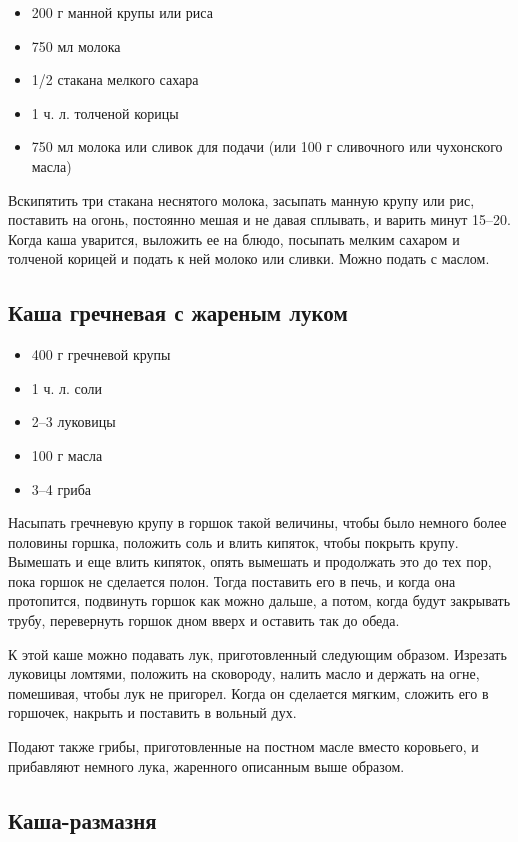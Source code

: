 \begin{itemize}
	\item 200 г манной крупы или риса
    \item 750 мл молока
    \item 1/2 стакана мелкого сахара
    \item 1 ч. л. толченой корицы 
    \item 750 мл молока или сливок для подачи (или 100 г сливочного или чухонского масла)
\end{itemize}

Вскипятить три стакана неснятого молока, засыпать манную крупу или рис, поставить на огонь, постоянно мешая и не давая сплывать, и варить минут 15–20. Когда каша уварится, выложить ее на блюдо, посыпать мелким сахаром и толченой корицей и подать к ней молоко или сливки. Можно подать с маслом.

\subsection{Каша гречневая с жареным луком}

\begin{itemize}
	\item 400 г гречневой крупы 
    \item 1 ч. л. соли
    \item 2–3 луковицы 
    \item 100 г масла
    \item 3–4 гриба
\end{itemize}

Насыпать гречневую крупу в горшок такой величины, чтобы было немного более половины горшка, положить соль и влить кипяток, чтобы покрыть крупу. Вымешать и еще влить кипяток, опять вымешать и продолжать это до тех пор, пока горшок не сделается полон. Тогда поставить его в печь, и когда она протопится, подвинуть горшок как можно дальше, а потом, когда будут закрывать трубу, перевернуть горшок дном вверх и оставить так до обеда.

К этой каше можно подавать лук, приготовленный следующим образом. Изрезать луковицы ломтями, положить на сковороду, налить масло и держать на огне, помешивая, чтобы лук не пригорел. Когда он сделается мягким, сложить его в горшочек, накрыть и поставить в вольный дух.

Подают также грибы, приготовленные на постном масле вместо коровьего, и прибавляют немного лука, жаренного описанным выше образом.

\subsection{Каша-размазня}

